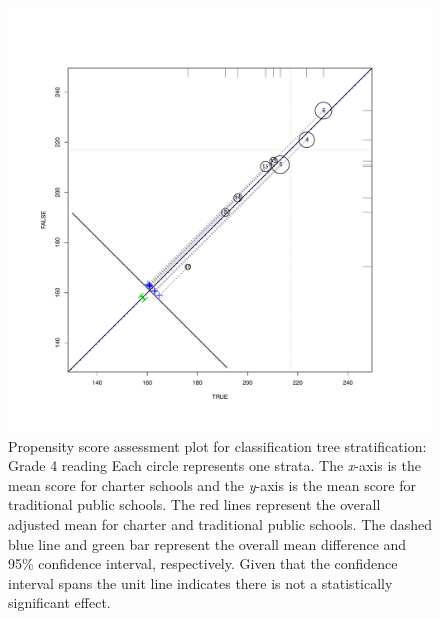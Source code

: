 \begin{figure}
\begin{center}
\includegraphics[trim=0 .7in 0 .7in]{../Figures2009/g4read-circpsa-tree.pdf}
\caption[Propensity score assessment plot for classification tree stratification: Grade 4 reading]{Propensity score assessment plot for classification tree stratification: Grade 4 reading Each circle represents one strata. The \textit{x}-axis is the mean score for charter schools and the \textit{y}-axis is the mean score for traditional public schools. The red lines represent the overall adjusted mean for charter and traditional public schools. The dashed blue line and green bar represent the overall mean difference and 95\% confidence interval, respectively. Given that the confidence interval spans the unit line indicates there is not a statistically significant effect.}
\end{center}
\end{figure}

\clearpage




